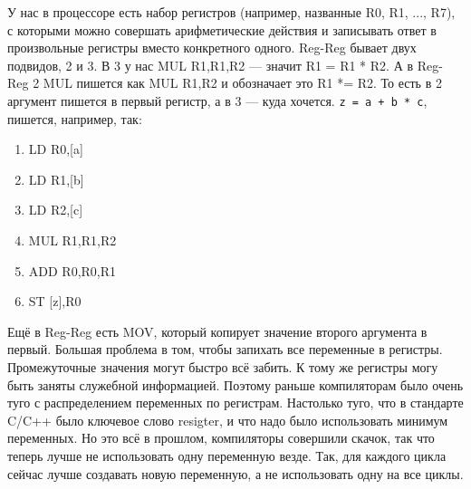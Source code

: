 \documentclass{article}
\begin{document}
    \begin{center}
    \end{center}
    У нас в процессоре есть набор регистров (например, названные R0, R1, ..., R7), с которыми можно совершать арифметические действия и записывать ответ в произвольные регистры вместо конкретного одного. Reg-Reg бывает двух подвидов, 2 и 3. В 3 у нас MUL R1,R1,R2 --- значит R1 = R1 * R2. А в Reg-Reg 2 MUL пишется как MUL R1,R2 и обозначает это R1 *= R2. То есть в 2 аргумент пишется в первый регистр, а в 3 --- куда хочется. \texttt{z = a + b * c}, пишется, например, так:
    \begin{enumerate}
        \item LD R0,[a]
        \item LD R1,[b]
        \item LD R2,[c]
        \item MUL R1,R1,R2
        \item ADD R0,R0,R1
        \item ST [z],R0
    \end{enumerate}
    Ещё в Reg-Reg есть MOV, который копирует значение второго аргумента в первый. Большая проблема в том, чтобы запихать все переменные в регистры. Промежуточные значения могут быстро всё забить. К тому же регистры могу быть заняты служебной информацией. Поэтому раньше компиляторам было очень туго с распределением переменных по регистрам. Настолько туго, что в стандарте C/C++ было ключевое слово resigter, и что надо было использовать минимум переменных. Но это всё в прошлом, компиляторы совершили скачок, так что теперь лучше не использовать одну переменную везде. Так, для каждого цикла сейчас лучше создавать новую переменную, а не использовать одну на все циклы.
\end{document}
